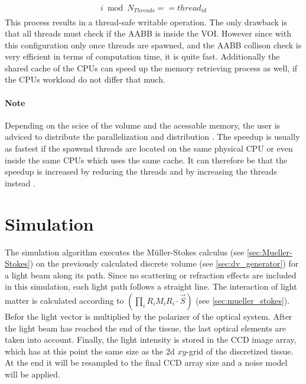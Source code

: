 % 
\begin{align}
\begin{split}
    i \bmod N_{\mathit{Threads}} == \mathit{thread}_{\mathit{id}}
\end{split}
\end{align}
% 
This process results in a thread-safe writable operation.
The only drawback is that all threads must check if the \ac{AABB} is inside the \ac{VOI}.
However since with this configuration only once threads are spawned, and the \ac{AABB} collison check is very efficient in terms of computation time, it is quite fast.
Additionally the shared cache of the \acp{CPU} can speed up the memory retrieving process as well, if the \acp{CPU} workload do not differ that much.
\par
\paragraph{Note}
Depending on the scice of the volume and the acessable memory, the user is adviced to distribute the \openmp{} parallelization and \mpi{} distribution \dummy{}.
The \openmp{} speedup is usually as fastest if the spawend threads are located on the same physical \ac{CPU} or even inside the same \acp{CPU} which uses the same cache.
It can therefore be that the speedup is increased by reducing the \openmp{} threads and by increasing the \mpi{} threads instead .
% 
% 
% 
\section{Simulation}
\label{sec:simulation}
% 
The simulation algorithm executes the M\"uller-Stokes calculus (see \cref{sec:Mueller-Stokes}) on the previously calculated discrete volume (see \cref{sec:dv_generator}) for a light beam along its path.
Since no scattering or refraction effects are included in this simulation, each light path follows a straight line.
The interaction of light matter is calculated according to $\left( \prod_i R_i M_i R_i \cdot \vec{S} \right)$ (see \cref{sec:mueller_stokes}). 
Befor the light vector is multiplied by the polarizer of the optical system.
After the light beam has reached the end of the tissue, the last optical elements are taken into account.
Finally, the light intensity is stored in the \acs{CCD} image array, which has at this point the same size as the 2d $xy$-grid of the discretized tissue.
At the end it will be resampled to the final \ac{CCD} array size and a noise model will be applied.
% 
%
